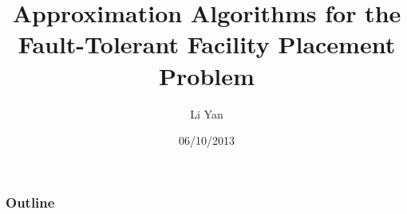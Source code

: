 \documentclass[hyperref,dvipsnames,svgnames,compress]{beamer}
\title[Approximation Algorithms for FTFP]{Approximation Algorithms
  for the Fault-Tolerant Facility Placement Problem}
\author[lyan@cs.ucr.edu]{Li Yan}
\institute[UCR]{
  Computer Science\\
  University of California Riverside\\
}
\date{06/10/2013}
\begin{document}
\begin{frame}
  \titlepage
\end{frame}

\begin{frame}
  \frametitle{Outline}
  \tableofcontents[hideallsubsections]
\end{frame}


\end{document}
